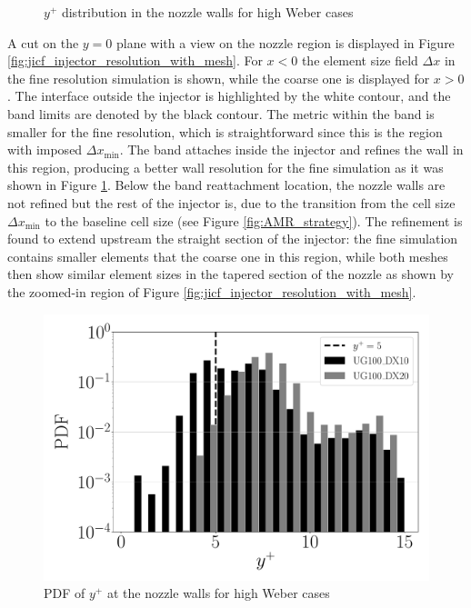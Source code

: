 \begin{figure}[ht]
\centering
{}
\caption{$y^+$ distribution in the nozzle walls for high Weber cases}
\label{fig:injector_visualization_y_plus}
\end{figure}





A cut on the $y = 0$ plane with a view on the nozzle region is displayed in Figure \ref{fig:jicf_injector_resolution_with_mesh}.  For $x < 0$ the element size field $\Delta x$ in the fine resolution simulation is shown, while the coarse one is displayed for $x > 0$. The interface outside the injector is highlighted by the white contour, and the band limits are denoted by the black contour. The metric within the band is smaller for the fine resolution, which is straightforward since this is the region with imposed $\Delta x_\mathrm{min}$. The band attaches inside the injector and refines the wall in this region, producing a better wall resolution for the fine simulation as it was shown in Figure \ref{fig:injector_visualization_y_plus}. Below the band reattachment location, the nozzle walls are not refined but the rest of the injector is, due to the transition from the cell size $\Delta x_\mathrm{min}$ to the baseline cell size (see Figure \ref{fig:AMR_strategy}). The refinement is found to extend upstream the straight section of the injector: the fine simulation contains smaller elements that the coarse one in this region, while both meshes then show similar element sizes in the tapered section of the nozzle as shown by the zoomed-in region of Figure \ref{fig:jicf_injector_resolution_with_mesh}.


\begin{figure}[ht]
	\centering
   \includegraphics[scale=0.20]{./part2_developments/figures_ch5_resolved_JICF/instabilities_resolution/y_plus_injector}
   \vspace{-0.15in}
   \caption{PDF of $y^+$ at the nozzle walls for high Weber cases}
   \label{fig:jicf_nozzle_y_plus_PDF}
\end{figure}

